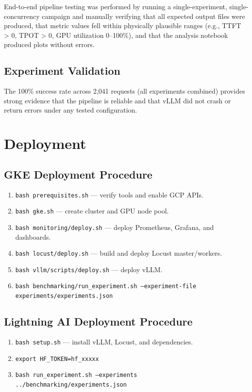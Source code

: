 \documentclass[a4paper,12pt]{report}
\begin{document}
End-to-end pipeline testing was performed by running a single-experiment, single-concurrency campaign and manually verifying that all expected output files were produced, that metric values fell within physically plausible ranges (e.g., TTFT > 0, TPOT > 0, GPU utilization 0--100\%), and that the analysis notebook produced plots without errors.

\subsection{Experiment Validation}

The 100\% success rate across 2{,}041 requests (all experiments combined) provides strong evidence that the pipeline is reliable and that vLLM did not crash or return errors under any tested configuration.

\section{Deployment}

\subsection{GKE Deployment Procedure}

\begin{enumerate}
    \item \texttt{bash prerequisites.sh} --- verify tools and enable GCP APIs.
    \item \texttt{bash gke.sh} --- create cluster and GPU node pool.
    \item \texttt{bash monitoring/deploy.sh} --- deploy Prometheus, Grafana, and dashboards.
    \item \texttt{bash locust/deploy.sh} --- build and deploy Locust master/workers.
    \item \texttt{bash vllm/scripts/deploy.sh} --- deploy vLLM.
    \item \texttt{bash benchmarking/run\_experiment.sh --experiment-file experiments/experiments.json}
\end{enumerate}

\subsection{Lightning AI Deployment Procedure}

\begin{enumerate}
    \item \texttt{bash setup.sh} --- install vLLM, Locust, and dependencies.
    \item \texttt{export HF\_TOKEN=hf\_xxxxx}
    \item \texttt{bash run\_experiment.sh --experiments ../benchmarking/experiments.json}
\end{enumerate}
\end{document}
